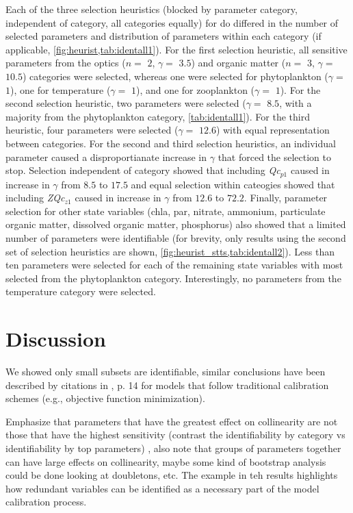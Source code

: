 \documentclass[letterpaper,12pt,oneside]{article}\usepackage[]{graphicx}\usepackage[]{color}
\begin{document}
Each of the three selection heuristics (blocked by parameter category, independent of category, all categories equally) for \ac{do} differed in the number of selected parameters and distribution of parameters within each category (if applicable, \cref{fig:heurist,tab:identall1}).  For the first selection heuristic, all sensitive parameters from the optics ($n = $ $2$, $\gamma =$  $3.5$) and organic matter ($n = $ $3$, $\gamma =$  $10.5$) categories were selected, whereas one were selected for phytoplankton ($\gamma = $ $1$), one for temperature ($\gamma = $ $1$), and one for zooplankton ($\gamma = $ $1$).  For the second selection heuristic, two parameters were selected ($\gamma = $ $8.5$, with a majority from the phytoplankton category, \cref{tab:identall1}).  For the third heuristic, four parameters were selected ($\gamma = $ $12.6$) with equal representation between categories. For the second and third selection heuristics, an individual parameter caused a disproportianate increase in $\gamma$ that forced the selection to stop.  Selection independent of category showed that including \textit{Qc$_{p1}$} caused in increase in $\gamma$ from $8.5$ to $17.5$ and equal selection within cateogies showed that including \textit{ZQc$_{z1}$} caused in increase in $\gamma$ from $12.6$ to $72.2$.  Finally, parameter selection for other state variables (\ac{chla}, \ac{par}, nitrate, ammonium, particulate organic matter, dissolved organic matter, phosphorus) also showed that a limited number of parameters were identifiable (for brevity, only results using the second set of selection heuristics are shown, \cref{fig:heurist_stts,tab:identall2}).  Less than ten parameters were selected for each of the remaining state variables with most selected from the phytoplankton category.  Interestingly, no parameters from the temperature category were selected.  

\section{Discussion}


We showed only small subsets are identifiable, similar conclusions have been described by citations in \citep{Wagener01}, p. 14 for models that follow traditional calibration schemes (e.g., objective function minimization).

Emphasize that parameters that have the greatest effect on collinearity are not those that have the highest sensitivity (contrast the identifiability by category vs identifiability by top parameters)  , also note that groups of parameters together can have large effects on collinearity, maybe some kind of bootstrap analysis could be done looking at doubletons, etc. The example in teh results highlights how redundant variables can be identified as a necessary part of the model calibration process.
\end{document}
